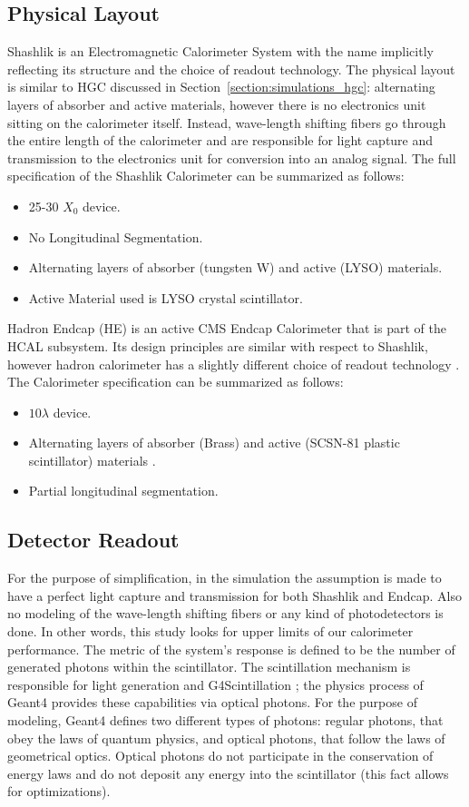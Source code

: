 \subsection{Physical Layout}
Shashlik is an Electromagnetic Calorimeter System with the name implicitly reflecting its structure and the choice of readout technology. The physical layout is similar to HGC discussed in Section~\ref{section:simulations_hgc}: alternating layers of absorber and active materials, however there is no electronics unit sitting on the calorimeter itself. Instead, wave-length shifting fibers go through the entire length of the calorimeter and are responsible for light capture and transmission to the electronics unit for conversion into an analog signal. The full specification of the Shashlik Calorimeter can be summarized as follows:
\begin{itemize}
    \item 25-30 $X_0$ device.
    \item No Longitudinal Segmentation.
    \item Alternating layers of absorber (tungsten W) and active (LYSO) materials.
    \item Active Material used is LYSO crystal scintillator.
\end{itemize}
Hadron Endcap (HE) is an active CMS Endcap Calorimeter that is part of the HCAL subsystem. Its design principles are similar with respect to Shashlik, however hadron calorimeter has a slightly different choice of readout technology \cite{Baiatian:2008zz}. The Calorimeter specification can be summarized as follows:
\begin{itemize}
    \item $10\lambda$ device.
    \item Alternating layers of absorber (Brass) and active (SCSN-81 plastic scintillator) materials \cite{Baiatian:2008zz}.
    \item Partial longitudinal segmentation.
\end{itemize}

\subsection{Detector Readout}
For the purpose of simplification, in the simulation the assumption is made to have a perfect light capture and transmission for both Shashlik and Endcap. Also no modeling of the wave-length shifting fibers or any kind of photodetectors is done. In other words, this study looks for upper limits of our calorimeter performance. The metric of the system's response is defined to be the number of generated photons within the scintillator. The scintillation mechanism is responsible for light generation and G4Scintillation \cite{geant4}; the physics process of {\sc Geant4} provides these capabilities via optical photons. For the purpose of modeling, {\sc Geant4} defines two different types of photons: regular photons, that obey the laws of quantum physics, and optical photons, that follow the laws of geometrical optics. Optical photons do not participate in the conservation of energy laws and do not deposit any energy into the scintillator (this fact allows for optimizations).

